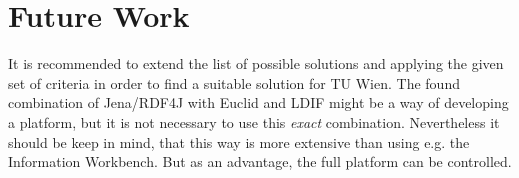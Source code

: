 \section{Future Work}

It is recommended to extend the list of possible solutions and applying the given 
set of criteria in order to find a suitable solution for TU Wien. The found 
combination of Jena/RDF4J with Euclid and LDIF might be a way of developing a 
platform, but it is not necessary to use this \emph{exact} combination. 
Nevertheless it should be keep in mind, that this way is more extensive than using 
e.g. the Information Workbench. But as an advantage, the full platform can be 
controlled.